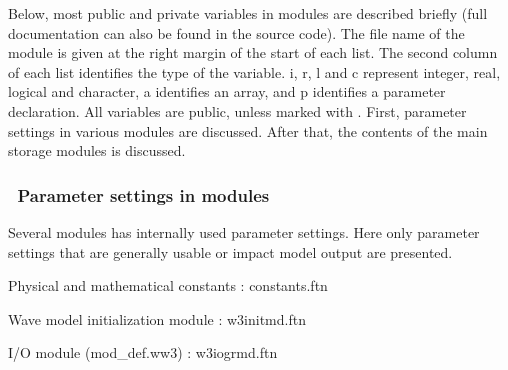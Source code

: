 Below, most {\F public} and {\F private} variables in modules are described
briefly (full documentation can also be found in the source code). The file
name of the module is given at the right margin of the start of each list. The
second column of each list identifies the type of the variable. {\F i}, {\F
r}, {\F l} and {\F c} represent integer, real, logical and character, {\F a}
identifies an array, and{ \F p} identifies a {\F parameter} declaration. All
variables are public, unless marked with \opt. First, parameter settings in
various modules are discussed. After that, the contents of the main storage
modules is discussed.

\vsssub
\subsubsection{~Parameter settings in modules}
\vsssub

Several modules has internally used parameter settings. Here only parameter
settings that are generally usable or impact model output are presented.

\vspace{\baselineskip} \noindent
Physical and mathematical constants : \hfill {\file constants.ftn}
\begin{vlist}
\end{vlist}

\noindent
Wave model initialization module : \hfill {\file w3initmd.ftn}
\begin{vlist}
\end{vlist}

\noindent
I/O module ({\file mod\_def.ww3}) : \hfill {\file w3iogrmd.ftn}
\begin{vlist}
\end{vlist}

